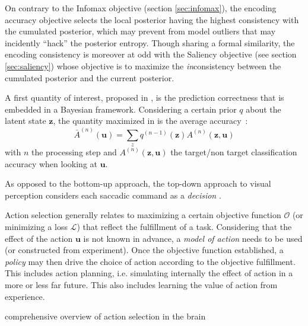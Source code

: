 \documentclass[12pt,twoside,openright]{article}
\begin{document}
On contrary to the Infomax objective (section \ref{sec:infomax}), the encoding accuracy objective selects the local posterior having the highest consistency with the cumulated posterior, which may prevent from model outliers that may incidently ``hack'' the posterior entropy.
Though sharing a formal similarity, the encoding consistency is moreover at odd with the Saliency objective (see section \ref{sec:saliency}) whose objective is to maximize the \emph{in}consistency between the cumulated posterior and the current posterior.

{\color{magenta}

A first quantity of interest, proposed in \cite{najemnik2005optimal}, is the prediction correctness that is embedded in a Bayesian framework. Considering a certain prior $q$ about the latent state $\boldsymbol{z}$, the quantity maximized in \cite{najemnik2005optimal} is the average accuracy~:
$$\bar{A}^{(n)}(\boldsymbol{u}) = \sum_z q^{(n-1)}(\boldsymbol{z}) A^{(n)}(\boldsymbol{z}, \boldsymbol{u})$$  
with $n$ the processing step and $A^{(n)}(\boldsymbol{z}, \boldsymbol{u})$ the target/non target classification accuracy when looking at $\boldsymbol{u}$.



As opposed to the bottom-up approach, the top-down approach to visual perception considers 
each saccadic command as a \emph {decision} \cite{berthoz1996neural}.


Action selection generally relates to maximizing a certain objective function $\mathcal{O}$ (or minimizing a loss $\mathcal{L}$) that reflect the fulfillment of a task. 
Considering that the effect of the action $\boldsymbol{u}$ is not known in advance, a \emph{model of action} needs to be used (or constructed from experiment).
Once the objective function established, a \emph{policy} may then drive the choice of action according to the objective fulfillment.  
This includes action planning, i.e. simulating internally the effect of action in a more or less far future. This also includes learning the value of action from experience. 



 comprehensive overview of action selection in the brain 



}
\end{document}
